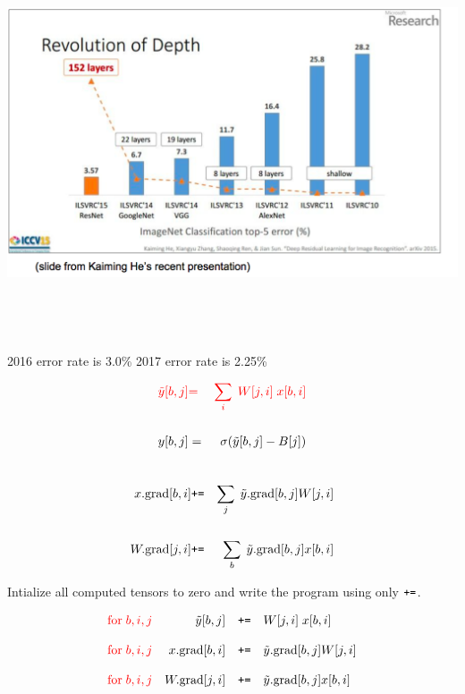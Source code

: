 {\vfill
\centerline{\includegraphics[height=4.5in]{../images/IVLSRC}}
2016 error rate is 3.0\% \hspace{1.0in} 2017 error rate is 2.25\%

\vspace{-3ex}
\begin{eqnarray*}
  {\color{red} \tilde{y}[b,j]} & {\color{red}  =} & {\color{red} \sum_i\;W[j,i]\;x[b,i]} \\
  \\
  y[b,j] & = & \sigma(\tilde{y}[b,j] - B[j]) \\
  \end{eqnarray*}

\vspace{-5ex}
{\color{red} 
  \begin{eqnarray*}
  \\
  x.\mathrm{grad}[b,i] & \mbox{\tt +=} & \sum_j\;\tilde{y}.\mathrm{grad}[b,j]W[j,i] \\
  \\
  W.\mathrm{grad}[j,i] & \mbox{\tt +=} & \sum_b\;\tilde{y}.\mathrm{grad}[b,j]x[b,i]
\end{eqnarray*}
}

Intialize all computed tensors to zero and write the program using only $\mbox{\tt +=}$.

$$
\begin{array}{lrcl}
{\color{red} \mathrm{for}\;b,i,j} & \tilde{y}[b,j] & \mbox{\tt +=} & W[j,i]\;x[b,i] \\
  \\
{\color{red} \mathrm{for}\;b,i,j} &  x.\mathrm{grad}[b,i] & \mbox{\tt +=} & \tilde{y}.\mathrm{grad}[b,j]W[j,i] \\
  \\
{\color{red} \mathrm{for}\;b,i,j} &  W.\mathrm{grad}[j,i] & \mbox{\tt +=} & \tilde{y}.\mathrm{grad}[b,j]x[b,i]
\end{array}
$$

}
